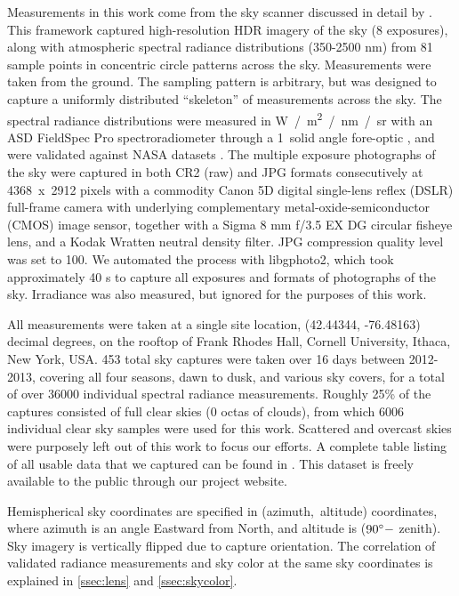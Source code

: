Measurements in this work come from the sky scanner discussed in detail by \citet{kider_framework_2014}. This framework captured high-resolution HDR imagery of the sky (8 exposures), along with atmospheric spectral radiance distributions (350-2500 nm) from 81 sample points in concentric circle patterns across the sky. Measurements were taken from the ground. The sampling pattern is arbitrary, but was designed to capture a uniformly distributed ``skeleton'' of measurements across the sky. The spectral radiance distributions were measured in W~/~m\textsuperscript{2}~/~nm~/~sr with an ASD FieldSpec Pro spectroradiometer through a 1\degree~solid angle fore-optic \citep{malthus_foreoptic}, and were validated against NASA datasets \citep{kider_framework_2014}. The multiple exposure photographs of the sky were captured in both CR2 (raw) and JPG formats consecutively at 4368~x~2912 pixels with a commodity Canon 5D digital single-lens reflex (DSLR) full-frame camera with underlying complementary metal-oxide-semiconductor (CMOS) image sensor, together with a Sigma 8 mm f/3.5 EX DG circular fisheye lens, and a Kodak Wratten neutral density filter. JPG compression quality level was set to 100. We automated the process with libgphoto2, which took approximately 40 s to capture all exposures and formats of photographs of the sky. Irradiance was also measured, but ignored for the purposes of this work.

All measurements were taken at a single site location, (42.44344, -76.48163) decimal degrees, on the rooftop of Frank Rhodes Hall, Cornell University, Ithaca, New York, USA. 453 total sky captures were taken over 16 days between 2012-2013, covering all four seasons, dawn to dusk, and various sky covers, for a total of over 36000 individual spectral radiance measurements. Roughly 25\% of the captures consisted of full clear skies (0 octas of clouds), from which 6006 individual clear sky samples were used for this work. Scattered and overcast skies were purposely left out of this work to focus our efforts. A complete table listing of all usable data that we captured can be found in \citet{delrocco_spie}. This dataset is freely available to the public through our project website.

Hemispherical sky coordinates are specified in (azimuth,~altitude) coordinates, where azimuth is an angle Eastward from North, and altitude is ($90\degree -$ zenith). Sky imagery is vertically flipped due to capture orientation. The correlation of validated radiance measurements and sky color at the same sky coordinates is explained in \autoref{ssec:lens} and \autoref{ssec:skycolor}.

